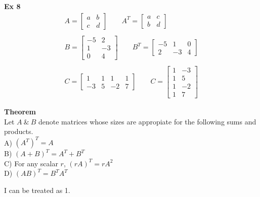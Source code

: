 \documentclass{article}
\begin{document}
    \textbf{Ex 8}
    \[
      \begin{gathered}
      A = 
      \begin{bmatrix}
        a &b\\
        c &d
      \end{bmatrix} \qquad 
      A^{T} = \begin{bmatrix}
        a &c\\
        b &d
      \end{bmatrix}\\
      ~\\
      B = \begin{bmatrix}
        -5 &2\\
        1 &-3\\
        0 &4
      \end{bmatrix} \qquad 
      B^{T} = \begin{bmatrix}
        -5 &1 &0\\
        2 &-3 &4
      \end{bmatrix}\\
      ~\\
      C = \begin{bmatrix}
        1 &1 &1 &1\\
        -3 &5 &-2 &7
      \end{bmatrix} \qquad
      C = \begin{bmatrix}
        1 &-3\\
        1 &5\\
        1 &-2\\
        1 &7
      \end{bmatrix}
      \end{gathered}
    \]

    \textbf{Theorem}\\
    Let $ A ~\&~ B $ denote matrices whose sizes are appropiate for the following sums and products.\\
    A) $ (A^{T} )^{T} =A $\\
    B) $ (A+B)^{T} =A^{T}+B^{T}$\\
    C) For any scalar $ r $, $ (rA)^{T} =rA^{2} $\\
    D) $ (AB)^{T}=B^{T}A^{T} $    
    

   I can be treated as 1. 
    
    
\end{document}
